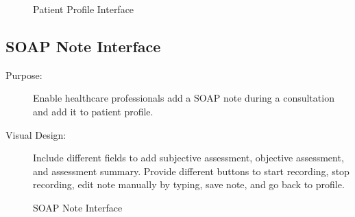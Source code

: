 \documentclass[12pt, titlepage]{article}
\begin{document}
\begin{figure}[h!]
    \centering
    \caption{Patient Profile Interface}
    \label{fig:healthcare-interface-2}
\end{figure}

\newpage{}

\subsection{SOAP Note Interface}
\begin{description}
    \item[Purpose:]Enable healthcare professionals add a SOAP note during a consultation and add it to patient profile.

    \item[Visual Design:]Include different fields to add subjective assessment, objective assessment, and assessment summary. Provide different buttons to start recording, stop recording, edit note manually by typing, save note, and go back to profile.
    
\end{description}

\begin{figure}[h!]
    \centering
    \caption{SOAP Note Interface}
    \label{fig:healthcare-interface-3}
\end{figure}
\end{document}
